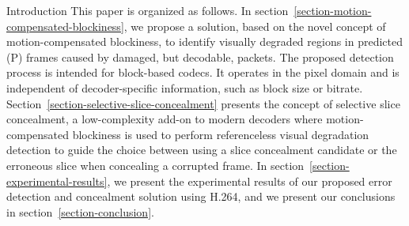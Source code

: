 \documentclass{article}
\begin{document}
\begin{section}{Introduction}
This paper is organized as follows. In 
section~\ref{section-motion-compensated-blockiness}, we propose a solution,
based on the novel concept of motion-compensated blockiness, to identify
visually degraded regions in predicted (P) frames caused by damaged, but 
decodable,
packets. The proposed detection process is intended for block-based codecs.
It operates in the pixel domain and is independent of decoder-specific
information, such as block size or bitrate. 
Section~\ref{section-selective-slice-concealment} presents the
concept of selective slice concealment, a low-complexity add-on to modern
decoders where motion-compensated blockiness is used to perform referenceless
visual degradation detection to guide the choice between using a slice
concealment candidate or the erroneous slice when concealing a corrupted frame.
In section~\ref{section-experimental-results}, we present the experimental 
results of our proposed error detection and concealment solution using H.264, 
and we present our conclusions in section~\ref{section-conclusion}.
\end{section}
\newcommand{\ltSlice}[1]{\mathbf{S}_{#1}}
\newcommand{\ltF}[1]{\mathbf{F}_{#1}}
\newcommand{\ltP}[1]{\mathbf{P}_{#1}}
\newcommand{\ltD}[1]{\mathbf{D}_{#1}}
\newcommand{\ltI}[1]{\mathbf{I}_{#1}}
\newcommand{\ltR}[1]{\mathbf{R}_{#1}}
\newcommand{\ltB}[1]{\mathbf{B}_{#1}}
\newcommand{\ltS}[1]{\mathcal{I}_{#1}}
\newcommand{\ltErr}[1]{\mathbf{\hat{F}}_{#1}}
\newcommand{\ltConc}[1]{\mathbf{F^{\prime}}_{#1}}
\newcommand{\ltOpt}[1]{\mathbf{F^{*}}_{#1}}

\newcommand{\ltMIN}[1]{\arg \min_{#1}}

\newcommand{\ltCB}[2]{\mathbf{b}_{#1}(#2)}
\newcommand{\ltBor}[1]{\mathcal{#1}}
\newcommand{\lttBLK}[2]{\textrm{MCB}_{#1}(#2)}
\newcommand{\ltSTBLK}[1]{\textrm{SMCB}(#1)}
\newcommand{\ltBV}[1]{\mathbf{BV}_{#1}}

\newcommand{\ltSAD}[1]{\textrm{SAD}(#1)} 
\end{document}
